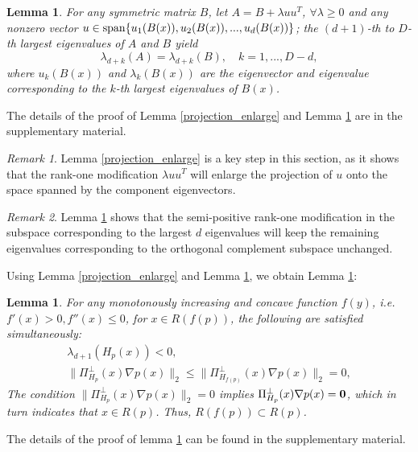 \documentclass[aos,preprint]{imsart}
\newtheorem{lemma}[theorem]{Lemma}
\theoremstyle{remark}
\newtheorem*{remark}{Remark}
\begin{document}
\begin{lemma}\label{eigvenvalue}
For any symmetric matrix $B$, let $A = B+\lambda u u^T$,  $\forall \lambda \geq 0$ and any nonzero vector $u\in  {\rm span}\{ u_1(B(x)), u_2(B(x)),..., u_d(B(x))\}$; the $(d+1)$-th  to $D$-th largest eigenvalues of $A$ and $B$ yield 
\[
\lambda_{d+k}(A) = \lambda_{d+k}(B),\quad k=1,...,D-d,
\]
where $u_k(B(x))$ and $\lambda_k(B(x))$ are the eigenvector and eigenvalue corresponding to the $k$-th largest eigenvalues of $B(x)$.
\end{lemma}
The details of the proof of Lemma \ref{projection_enlarge} and Lemma \ref{eigvenvalue} are in the supplementary material. %
\begin{remark}
Lemma \ref{projection_enlarge} is a key step in this section, as it shows that the rank-one modification $\lambda uu^T$ will enlarge the projection of $u$ onto the space spanned by the component eigenvectors.
\end{remark}
\begin{remark}
Lemma \ref{eigvenvalue} shows that the semi-positive rank-one modification in the subspace corresponding to the largest $d$ eigenvalues will keep the remaining eigenvalues corresponding to the orthogonal complement subspace unchanged.
\end{remark}
Using Lemma \ref{projection_enlarge} and Lemma \ref{eigvenvalue}, we obtain Lemma \ref{monotonously theorem}:
\begin{lemma}{
For any monotonously increasing and concave function $f(y)$, i.e. $f'(x)>0, f''(x) \leq 0$, for $x\in R({f(p)})$, the following are satisfied simultaneously:
 \begin{gather*}
 \lambda_{d+1}(H_p(x)) < 0,\\
\|\Pi_{H_p}^\perp(x)\nabla p(x)\|_2 \leq \|\Pi_{H_{f(p)}}^{\perp}(x)\nabla p(x)\|_2=0,
\end{gather*}
The condition $\|\Pi_{H_p}^\perp(x)\nabla p(x)\|_2  =0$ implies $\Pi_{H_p}^\perp(x)\nabla p(x)=\bf 0$, which in turn indicates that $x\in R(p)$. Thus, $R(f(p)) \subset R(p)$}. %
\label{monotonously theorem} 
\end{lemma}

The details of the proof of lemma \ref{monotonously theorem} can be found in the supplementary material. %
\end{document}
